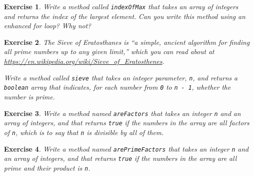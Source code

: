 \documentclass[12pt]{book}
\theoremstyle{exercise}
\newtheorem{exercise}{Exercise}[chapter]
\newcommand{\java}[1]{\verb"#1"}
\begin{document}
\begin{exercise}
Write a method called \java{indexOfMax} that takes an array of integers and returns the index of the largest element.
Can you write this method using an enhanced for loop?  Why not?
\end{exercise}


\begin{exercise}
The Sieve of Eratosthanes is ``a simple, ancient algorithm for finding all prime numbers up to any given limit,'' which you can read about at \url{https://en.wikipedia.org/wiki/Sieve_of_Eratosthenes}.

Write a method called \java{sieve} that takes an integer parameter, \java{n}, and returns a \java{boolean} array that indicates, for each number from \java{0} to \java{n - 1}, whether the number is prime.
\end{exercise}


\begin{exercise}
Write a method named \java{areFactors} that takes an integer \java{n} and an array of integers, and that returns \java{true} if the numbers in the array are all factors of \java{n}, which is to say that \java{n} is divisible by all of them.
\end{exercise}


\begin{exercise}
Write a method named \java{arePrimeFactors} that takes an integer \java{n} and an array of integers, and that returns \java{true} if the numbers in the array are all prime {\em and} their product is \java{n}.
\end{exercise}
\end{document}
